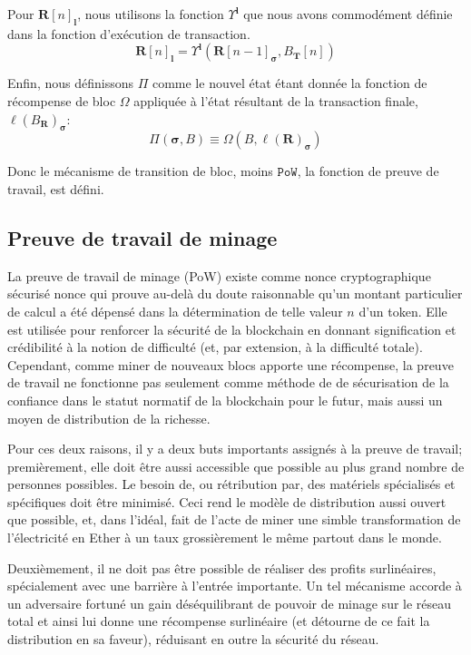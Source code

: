 \documentclass[9pt,oneside]{amsart}
\begin{document}
\begin{multicols}{2}
Pour $\mathbf{R}[n]_\mathbf{l}$, nous utilisons la fonction $\Upsilon^\mathbf{l}$ que nous avons commodément définie dans la fonction d'exécution de transaction.
\begin{equation}
\mathbf{R}[n]_\mathbf{l} =
\Upsilon^\mathbf{l}(\mathbf{R}[n - 1]_{\boldsymbol{\sigma}}, B_\mathbf{T}[n])
\end{equation}

Enfin, nous définissons $\Pi$ comme le nouvel état étant donnée la fonction de récompense de bloc $\Omega$ appliquée à l'état résultant de la transaction finale, $\ell(B_\mathbf{R})_{\boldsymbol{\sigma}}$:
\begin{equation}
\Pi(\boldsymbol{\sigma}, B) \equiv \Omega(B, \ell(\mathbf{R})_{\boldsymbol{\sigma}})
\end{equation}

Donc le mécanisme de transition de bloc, moins  $\mathtt{PoW}$, la fonction de preuve de travail, est défini.

\subsection{Preuve de travail de minage} \label{ch:pow}


La preuve de travail de minage (PoW) existe comme nonce cryptographique sécurisé nonce qui prouve au-delà du doute raisonnable qu'un montant particulier de calcul a été dépensé dans la détermination de telle valeur $n$ d'un token. Elle est utilisée pour renforcer la sécurité de la blockchain en donnant signification et crédibilité à la notion de difficulté (et, par extension, à la difficulté totale). Cependant, comme miner de nouveaux blocs apporte une récompense, la preuve de travail ne fonctionne pas seulement comme méthode de de sécurisation de la confiance dans le statut normatif de la blockchain pour le futur, mais aussi un moyen de distribution de la richesse.

Pour ces deux raisons, il y a deux buts importants assignés à la preuve de travail; premièrement, elle doit être aussi accessible que possible au plus grand nombre de personnes possibles. Le besoin de, ou rétribution par, des matériels spécialisés et spécifiques doit être minimisé. Ceci rend le modèle de distribution aussi ouvert que possible, et, dans l'idéal, fait de l'acte de miner une simble transformation de l'électricité en Ether à un taux grossièrement le même partout dans le monde.

Deuxièmement, il ne doit pas être possible de réaliser des profits surlinéaires, spécialement avec une barrière à l'entrée importante. Un tel mécanisme accorde à un adversaire fortuné un gain déséquilibrant de pouvoir de minage sur le réseau total et ainsi lui donne une récompense surlinéaire (et détourne de ce fait la distribution en sa faveur), réduisant en outre la sécurité du réseau.


\end{multicols}
\end{document}

